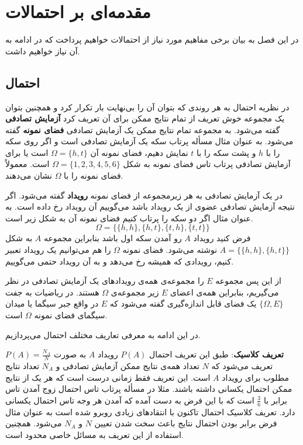 \chapter{مقدمه‌ای بر احتمالات}
\label{ch1}
در این فصل به بیان برخی مفاهیم مورد نیاز از احتمالات خواهیم پرداخت که در ادامه به آن نیاز خواهیم داشت.

\section{احتمال}
\label{ch1:sec2:sample_space}

در نظریه احتمال به هر روندی که بتوان آن را بی‌نهایت بار تکرار کرد و همچنین بتوان یک مجموعه خوش‌ تعریف از تمام نتایج ممکن برای آن تعریف کرد \textbf{آزمایش تصادفی} گفته می‌شود. به مجموعه تمام نتایج ممکن یک آزمایش تصادفی \textbf{فضای نمونه} گفته می‌شود. به عنوان مثال مسأله پرتاب سکه یک آزمایش تصادفی است و اگر روی سکه را با $h$ و پشت سکه را با $t$ نمایش دهیم، فضای نمونه آن $\Omega = \{h,t\}$ است یا برای آزمایش تصادفی پرتاب تاس فضای نمونه به شکل $\Omega = \{1,2,3,4,5,6\}$ است. معمولاً فضای نمونه را با $\Omega$ نشان می‌دهند. 

در یک آزمایش تصادفی به هر زیرمجموعه از فضای نمونه \textbf{رویداد} گفته می‌شود. اگر نتیجه آزمایش تصادفی عضوی از یک رویداد باشد می‌گوییم آن رویداد رخ داده است. به عنوان مثال اگر دو سکه را پرتاب کنیم فضای نمونه آن به شکل زیر است.
$$\Omega = \{ \{h,h\} , \{h,t\} , \{t,h\} , \{t,t\} \}$$
فرض کنید رویداد $A$ رو آمدن سکه اول باشد بنابراین مجموعه $A$ به شکل $A = \{ \{h,h\} , \{h,t\} \}$ نوشته می‌شود. فضای نمونه $\Omega$ را هم می‌توانیم یک رویداد تعبیر کنیم، رویدادی که همیشه رخ می‌دهد و به ‌آن رویداد حتمی می‌گوییم.

از این پس مجموعه $E$ را مجموعه‌ی همه‌ی رویدادهای یک آزمایش تصادفی در نظر می‌گیریم، بنابراین همه‌ی اعضای $E$ زیر مجموعه‌‌ی $\Omega$ هستند. در ریاضیات به جفت $\{\Omega,E\}$ یک فضای قابل اندازه‌گیری گفته می‌شود که $E$ در‌ واقع جبر سیگما یا میدان سیگمای فضای نمونه $\Omega$ است.

در این ادامه به معرفی تعاریف مختلف احتمال می‌پردازیم.

\textbf{تعریف کلاسیک}: طبق این تعریف احتمال $P(A)$ رویداد $A$ به صورت $P(A)=\frac{N_A}{N}$ تعریف می‌شود که $N$ تعداد همه‌ی نتایج ممکن آزمایش تصادفی و $N_A$ تعداد نتایج مطلوب برای رویداد $A$ است. این تعریف فقط زمانی درست است که هر یک از نتایج ممکن احتمال یکسانی داشته باشند. 
مثلا در مسأله پرتاب تاس احتمال زوج آمدن تاس برابر با $\frac{3}{6}$ است که با این فرض به دست آمده که آمدن هر وجه تاس احتمال یکسانی دارد. 
 تعریف کلاسیک احتمال تاکنون با انتقادهای زیادی روبرو شده است به عنوان مثال فرض برابر بودن احتمال نتایج باعث سخت شدن تعیین $N$ و $N_A$ می‌شود. همچنین استفاده از این تعریف به مسائل خاصی محدود است.\cite{ross_first_2014}


